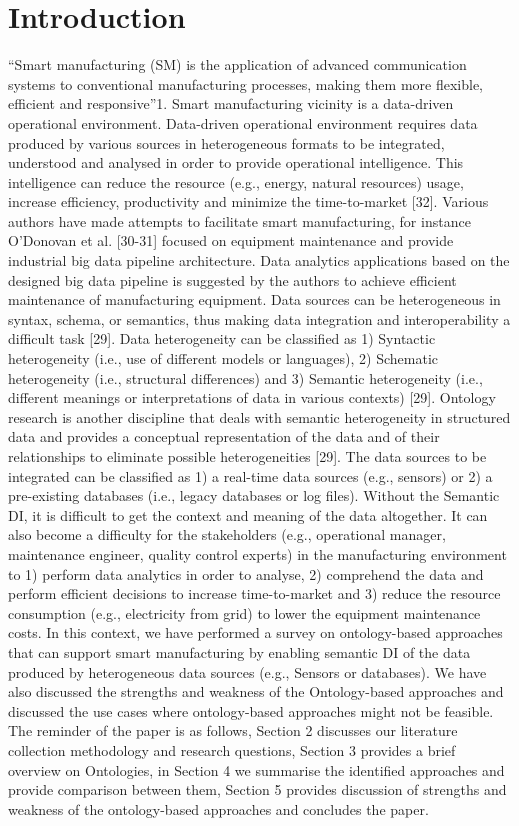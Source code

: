 \section{Introduction}
\label{sec:intro}
\vspace{-.3cm}
“Smart manufacturing (SM) is the application of advanced communication systems to conventional manufacturing processes, making them more flexible, efficient and responsive”1. Smart manufacturing vicinity is a data-driven operational environment. Data-driven operational environment requires data produced by various sources in heterogeneous formats to be integrated, understood and analysed in order to provide operational intelligence. This intelligence can reduce the resource (e.g., energy, natural resources) usage, increase efficiency, productivity and minimize the time-to-market [32]. Various authors have made attempts to facilitate smart manufacturing, for instance O’Donovan et al. [30-31] focused on equipment maintenance and provide industrial big data pipeline architecture. Data analytics applications based on the designed big data pipeline is suggested by the authors to achieve efficient maintenance of manufacturing equipment.
Data sources can be heterogeneous in syntax, schema, or semantics, thus making data integration and interoperability a difficult task [29]. Data heterogeneity can be classified as 1) Syntactic heterogeneity (i.e., use of different models or languages), 2) Schematic heterogeneity (i.e., structural differences) and 3) Semantic heterogeneity (i.e., different meanings or interpretations of data in various contexts) [29]. Ontology research is another discipline that deals with semantic heterogeneity in structured data and provides a conceptual representation of the data and of their relationships to eliminate possible heterogeneities [29]. The data sources to be integrated can be classified as 1) a real-time data sources (e.g., sensors) or 2) a pre-existing databases (i.e., legacy databases or log files).
Without the Semantic DI, it is difficult to get the context and meaning of the data altogether. It can also become a difficulty for the stakeholders (e.g., operational manager, maintenance engineer, quality control experts) in the manufacturing environment to 1) perform data analytics in order to analyse, 2) comprehend the data and perform efficient decisions to increase time-to-market and 3) reduce the resource consumption (e.g., electricity from grid) to lower the equipment maintenance costs. In this context, we have performed a survey on ontology-based approaches that can support smart manufacturing by enabling semantic DI of the data produced by heterogeneous data sources (e.g., Sensors or databases). We have also discussed the strengths and weakness of the Ontology-based approaches and discussed the use cases where ontology-based approaches might not be feasible. 
The reminder of the paper is as follows, Section 2 discusses our literature collection methodology and research questions, Section 3 provides a brief overview on Ontologies, in Section 4 we summarise the identified approaches and provide comparison between them,  Section 5  provides discussion of strengths and weakness of the ontology-based approaches and concludes the paper.
